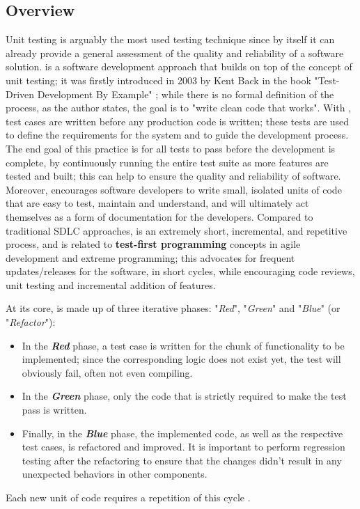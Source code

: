 \subsection{Overview}
Unit testing is arguably the most used testing technique since by itself it can already provide a general assessment of the quality and reliability of a software solution. \tdd is a software development approach that builds on top of the concept of unit testing; it was firstly introduced in 2003 by Kent Back in the book "Test-Driven Development By Example" \cite{TDDByExample}; while there is no formal definition of the process, as the author states, the goal is to "write clean code that works". With \tdd, test cases are written before any production code is written; these tests are used to define the requirements for the system and to guide the development process. 
The end goal of this practice is for all tests to pass before the development is complete, by continuously running the entire test suite as more features are tested and built; this can help to ensure the quality and reliability of software. Moreover, \tdd encourages software developers to write small, isolated units of code that are easy to test, maintain and understand, and will ultimately act themselves as a form of documentation for the developers. 
Compared to traditional SDLC approaches, \tdd is an extremely short, incremental, and repetitive process, and is related to \textbf{test-first programming} concepts in agile development and extreme programming; this advocates for frequent updates/releases for the software, in short cycles, while encouraging code reviews, unit testing and incremental addition of features.


At its core, \tdd is made up of three iterative phases: "\textit{Red}", "\textit{Green}" and "\textit{Blue}" (or "\textit{Refactor}"):
\begin{itemize}
    \item In the \textbf{\textit{Red}} phase, a test case is written for the chunk of functionality to be implemented; since the corresponding logic does not exist yet, the test will obviously fail, often not even compiling.
    \item In the \textbf{\textit{Green}} phase, only the code that is strictly required to make the test pass is written.
    \item Finally, in the \textbf\textit{{Blue}} phase, the implemented code, as well as the respective test cases, is refactored and improved. It is important to perform regression testing after the refactoring to ensure that the changes didn't result in any unexpected behaviors in other components.
\end{itemize}
Each new unit of code requires a repetition of this cycle \cite{GuidelinesTDD}.


